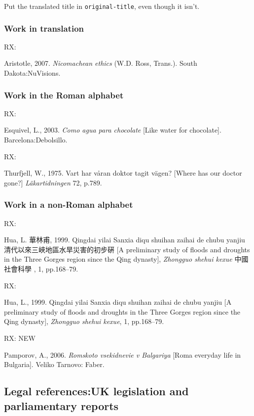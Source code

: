 Put the translated title in \texttt{original-title}, even though it isn't.

\subsubsection*{Work in translation}

RX: \cite{aristotle2007ne}

Aristotle, 2007. \emph{Nicomachean ethics} (W.D. Ross, Trans.). South Dakota:\@ NuVisions.



\subsubsection*{Work in the Roman alphabet}

RX: \cite{esquivel2003cap}

Esquivel, L., 2003. \emph{Como agua para chocolate} [Like water for chocolate]. Barcelona:\@ Debolsillo.



RX: \cite{thurfjell1975vhv}

Thurfjell, W., 1975. Vart har våran doktor tagit vägen? [Where has our doctor gone?] \emph{Läkartidningen} 72, p.789.



\subsubsection*{Work in a non-Roman alphabet}

RX: \cite{hua1999qys1}

Hua, L. 華林甫, 1999.  Qingdai yilai Sanxia diqu shuihan zaihai de chubu yanjiu 清代以來三峽地區水旱災害的初步硏 [A preliminary study of floods and droughts in the Three Gorges region since the Qing dynasty], \emph{Zhongguo shehui kexue} 中國社會科學 , 1, pp.168--79.


RX: \cite{hua1999qys2}

Hua, L., 1999. Qingdai yilai Sanxia diqu shuihan zaihai de chubu yanjiu [A preliminary study of floods and droughts in the Three Gorges region since the Qing dynasty], \emph{Zhongguo shehui kexue}, 1, pp.168--79.


RX: \cite{pamporov2006rvb} NEW

Pamporov, A., 2006. \emph{Romskoto vsekidnevie v Balgariya} [Roma everyday life in Bulgaria]. Veliko Tarnovo: Faber.



\subsection{Legal references:\@ UK legislation and parliamentary reports}

